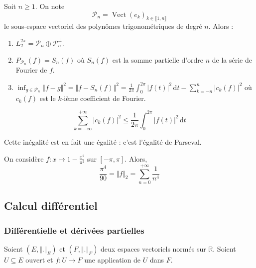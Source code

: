 	
	\begin{corollary}
		Soit $n \geq 1$. On note \[ \mathcal{P}_n = \operatorname{Vect}(e_k)_{k \in \llbracket 1, n \rrbracket} \]
		le sous-espace vectoriel des polynômes trigonométriques de degré $n$. Alors :
		\begin{enumerate}[label=(\roman*)]
			\item $L_2^{2\pi} = \mathcal{P}_n \oplus \mathcal{P}_n^\perp$.
			\item $P_{\mathcal{P}_n}(f) = S_n(f)$
			où $S_n(f)$ est la somme partielle d'ordre $n$ de la série de Fourier de $f$.
			\item $\inf_{g \in \mathcal{P}_n} \Vert f-g \Vert^2 = \Vert f-S_n(f) \Vert^2 = \frac{1}{2\pi} \int_0^{2\pi} \vert f(t) \vert^2 \, \mathrm{d}t - \sum_{k=-n}^{n} \vert c_k(f) \vert^2$
			où $c_k(f)$ est le $k$-ième coefficient de Fourier.
		\end{enumerate}
	\end{corollary}
	
	\begin{application}
		\[ \sum_{k=-\infty}^{+\infty} \vert c_k(f) \vert^2 \leq \frac{1}{2\pi} \int_0^{2\pi} \vert f(t) \vert^2 \, \mathrm{d}t \]
	\end{application}
	
	\begin{remark}
		Cette inégalité est en fait une égalité : c'est l'égalité de Parseval.
	\end{remark}
	
	\begin{example}
		On considère $f : x \mapsto 1 - \frac{x^2}{\pi^2}$ sur $[-\pi, \pi]$. Alors,
		\[ \frac{\pi^4}{90} = \Vert f \Vert_2 = \sum_{n=0}^{+\infty} \frac{1}{n^4} \]
	\end{example}
	
	\subsection{Calcul différentiel}
	
	\subsubsection{Différentielle et dérivées partielles}
	
	
	Soient $(E, \Vert . \Vert_E)$ et $(F, \Vert . \Vert_F)$ deux espaces vectoriels normés sur $\mathbb{R}$. Soient $U \subseteq E$ ouvert et $f : U \rightarrow F$ une application de $U$ dans $F$.
	
